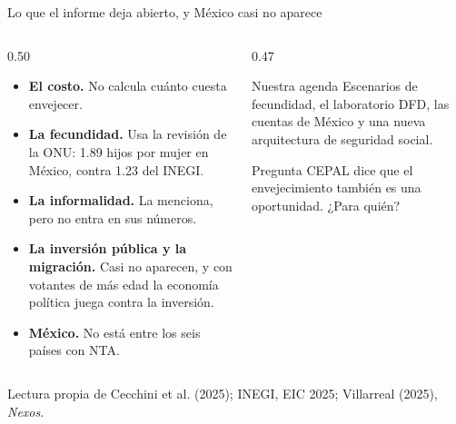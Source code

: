 \documentclass[aspectratio=169,11pt]{beamer}
\newcommand{\fuente}[1]{\par\vfill{\small\color{cGris}#1\par}}
\begin{document}
\begin{frame}{Lo que el informe deja abierto, y México casi no aparece}
  \begin{columns}[T]
    \begin{column}{0.50\textwidth}
      \begin{itemize}
        \item \textbf{El costo.} No calcula cuánto cuesta envejecer.
        \item \textbf{La fecundidad.} Usa la revisión de la ONU: 1.89 hijos por mujer en México, contra 1.23 del INEGI.
        \item \textbf{La informalidad.} La menciona, pero no entra en sus números.
        \item \textbf{La inversión pública y la migración.} Casi no aparecen, y con votantes de más edad la economía política juega contra la inversión.
        \item \textbf{México.} No está entre los seis países con NTA.
      \end{itemize}
    \end{column}
    \begin{column}{0.47\textwidth}
      \pause
      \begin{block}{Nuestra agenda}
        Escenarios de fecundidad, el laboratorio DFD, las cuentas de México y una nueva arquitectura de seguridad social.
      \end{block}
      \pause
      \begin{alertblock}{Pregunta}
        CEPAL dice que el envejecimiento también es una oportunidad. ¿Para quién?
      \end{alertblock}
    \end{column}
  \end{columns}
  \fuente{Lectura propia de Cecchini et al. (2025); INEGI, EIC 2025; Villarreal (2025), \emph{Nexos}.}
\end{frame}
\end{document}
